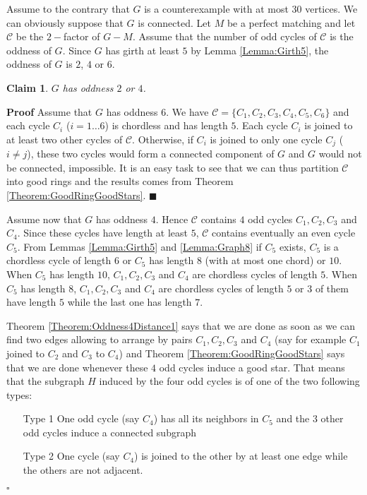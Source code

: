 \documentclass{elsart}
\theoremstyle{plain} \theoremheaderfont{\scshape}
\newtheorem{Clm}{Claim}[Thm]
\newenvironment{Prf}{{\bf \noindent Proof } }{\hfill$\square$\\}
\newenvironment{PrfClaim}{{\bf Proof }}{{\hfill\tiny{$\blacksquare$\\}}}
\begin{document}
\begin{Prf}
Assume to the contrary that $G$ is a counterexample with at most
$30$ vertices. We can obviously suppose that $G$ is connected. Let
$M$ be a perfect matching and let $\mathcal C$ be the $2-$factor of
$G-M$. Assume that the number of odd cycles of $\mathcal C$ is the
oddness of $G$.  Since $G$ has girth at least $5$ by Lemma
\ref{Lemma:Girth5}, the oddness of $G$ is $2$, $4$ or $6$.
\begin{Clm} \label{Claim:Claim1MinimummCounterExample32}
$G$ has oddness $2$ or $4$.
\end{Clm}
\begin{PrfClaim} Assume  that $G$ has oddness $6$. We have
$\mathcal C=\{C_1,C_2,C_3,C_4,C_5,C_6\}$ and each cycle $C_i$ ($i=1
\ldots 6$) is chordless and has length $5$. Each cycle $C_i$ is
joined to at least two other cycles of $\mathcal C$. Otherwise, if
$C_i$ is joined to only one cycle $C_j$ ($i \not = j$), these two
cycles would form a connected component of $G$ and  $G$ would not be
connected, impossible. It is an easy task to see that we can thus
partition $\mathcal C$  into good rings and the results comes from
Theorem \ref{Theorem:GoodRingGoodStars}.
\end{PrfClaim}

Assume now that $G$ has oddness $4$. Hence $\mathcal C$ contains $4$
odd cycles $C_1,C_2,C_3$ and $ C_4$. Since these cycles have length
at least $5$, $\mathcal C$ contains eventually an even cycle $C_5$.
From Lemmas \ref{Lemma:Girth5} and  \ref{Lemma:Graph8}
 if $C_5$ exists,  $C_5$ is a chordless cycle of length $6$ or $C_5$ has length
$8$ (with at most one chord) or $10$. When $C_5$ has length $10$,
$C_1,C_2,C_3$ and $C_4$ are chordless cycles of length $5$. When
$C_5$ has length $8$, $C_1,C_2,C_3$ and $C_4$ are chordless cycles
of length $5$ or $3$ of them have length $5$ while the last one has
length $7$.




Theorem \ref{Theorem:Oddness4Distance1} says that we are done as
soon as we can  find two edges allowing to arrange by pairs
$C_1,C_2,C_3$ and $C_4$  (say for example $C_1$ joined to $C_2$ and
$C_3$ to $C_4$)  and Theorem \ref{Theorem:GoodRingGoodStars} says
that we are done whenever these $4$ odd cycles induce a good star.
That means that the subgraph $H$ induced  by the four odd cycles is
of one of the two following types:

\begin{itemize}
  \item [Type 1]One odd cycle (say $C_4$) has all its neighbors in $C_5$ and the $3$
other odd cycles induce a connected subgraph
  \item [Type 2] One cycle (say
$C_4$) is joined to the other by at least one edge while the others
are not adjacent.
\end{itemize}


\end{Prf}
\end{document}

